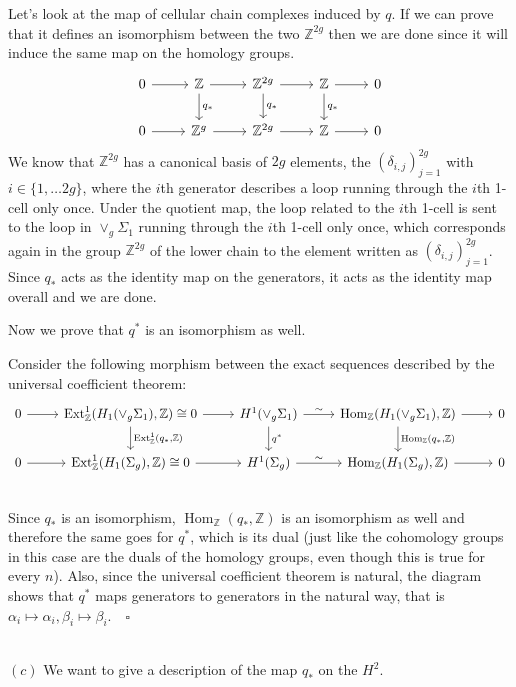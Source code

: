 \documentclass{article}
\newcommand{\numberset}{\mathbb}
\newcommand{\Z}{\numberset{Z}}
\DeclareMathOperator{\Ext}{Ext}
\DeclareMathOperator{\Hom}{Hom}
\begin{document}
Let's look at the map of cellular chain complexes induced by $q$. If we can
prove that it defines an isomorphism between the two $\Z^{2g}$
then we are done since it will induce the same map on the homology groups.
\[
    \begin{tikzcd}
        0\arrow{r} &\Z\arrow{d}{q_*}\arrow{r}
        &\Z^{2g}\arrow{d}{q_*}\arrow{r} &\Z\arrow{d}{q_*}\arrow{r} &0 \\
        0\arrow{r} &\Z^g\arrow{r} &\Z^{2g}\arrow{r} &\Z\arrow{r} &0
    \end{tikzcd}
\]
We know that $\Z^{2g}$ has a canonical basis of $2g$ elements, the
$(\delta_{i,j})_{j=1}^{2g}$ with $i\in\{1,\ldots 2g\}$, where the $i$th
generator describes a loop running through the $i$th 1-cell only once.
Under the quotient map, the loop related
to the $i$th 1-cell is sent to the loop in $\vee_g\Sigma_1$ running through the
$i$th 1-cell only once, which corresponds again in the group $\Z^{2g}$ of the
lower chain to the element written as $(\delta_{i,j})_{j=1}^{2g}$. Since $q_*$
acts as the identity map on
the generators, it acts as the identity map overall and we are done.

Now we prove that $q^*$ is an isomorphism as well.

Consider the following morphism between the exact sequences described by the
universal coefficient theorem:
\[
    \begin{tikzcd}
        0\arrow{r} &\Ext^1_{\Z}(H_1(\vee_g\Sigma_1),\Z)\cong
        0\arrow{r}\arrow{d}{\Ext^1_{\Z}(q_*,\Z)}
        &H^1(\vee_g\Sigma_1)\arrow{r}{\sim}\arrow{d}{q^*}
        &\Hom_{\Z}(H_1(\vee_g\Sigma_1),\Z)\arrow{r}\arrow{d}{\Hom_{\Z}(q_*,\Z)} &0 \\
        0\arrow{r} &\Ext^1_{\Z}(H_1(\Sigma_g),\Z)\cong 0\arrow{r}
        &H^1(\Sigma_g)\arrow{r}{\sim} &\Hom_{\Z}(H_1(\Sigma_g),\Z)\arrow{r} &0 \\
    \end{tikzcd}
\]
Since $q_*$ is an isomorphism, $\Hom_{\Z}(q_*,\Z)$ is an isomorphism as well and
therefore the same goes for $q^*$, which is its dual (just like the cohomology
groups in this case are the duals of the homology groups, even though this is
true for every $n$). Also, since the
universal coefficient theorem is natural, the diagram shows that $q^*$ maps
generators to generators in the natural way, that is
$\alpha_i\mapsto\alpha_i,\beta_i\mapsto\beta_i$.$\quad\square$

~\\
\proof $(c)$ We want to give a description of the map $q_*$ on the $H^2$.
\end{document}
